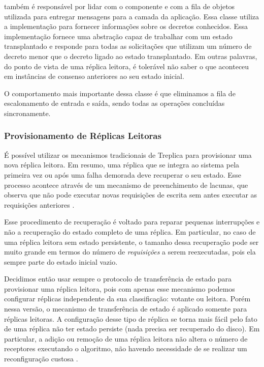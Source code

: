  também é responsável por lidar com o componente
 e com a fila de objetos utilizada para entregar mensagens para a camada
da aplicação. Essa classe utiliza a implementação  para
fornecer informações sobre os decretos conhecidos. Essa implementação fornece uma
abstração capaz de trabalhar com um estado transplantado e responde  para
todas as solicitações que utilizam um número de decreto menor que o decreto ligado ao
estado transplantado. Em outras palavras, do ponto de vista de uma réplica leitora, é
tolerável não saber o que aconteceu em instâncias de consenso anteriores ao seu estado
inicial.

O comportamento mais importante dessa classe é que eliminamos a fila de escalonamento de
entrada e saída, sendo todas as operações concluídas sincronamente.

\subsubsection{Provisionamento de Réplicas Leitoras}

É possível utilizar os mecanismos tradicionais de Treplica para provisionar uma nova
réplica leitora. Em resumo, uma réplica que se integra ao sistema pela primeira vez ou
após uma falha demorada deve recuperar o seu estado. Esse processo acontece através de um
mecanismo de preenchimento de lacunas, que observa que não pode executar novas requisições
de escrita sem antes executar as requisições anteriores \cite{vieira-tr10b}.

Esse procedimento de recuperação é voltado para reparar pequenas interrupções e não a
recuperação do estado completo de uma réplica. Em particular, no caso de uma réplica
leitora sem estado persistente, o tamanho dessa recuperação pode ser muito grande em
termos do número de \emph{requisições} a serem reexecutadas, pois ela sempre parte do
estado inicial vazio.

Decidimos então usar sempre o protocolo de transferência de estado para provisionar uma
réplica leitora, pois com apenas esse mecanismo podemos configurar réplicas independente
da sua classificação: votante ou leitora. Porém nessa versão, o mecanismo de transferência
de estado é aplicado somente para réplicas leitoras. A configuração desse tipo de réplica
se torna mais fácil pelo fato de uma réplica não ter estado persiste (nada precisa ser
recuperado do disco). Em particular, a adição ou remoção de uma réplica leitora não altera
o número de receptores executando o algoritmo, não havendo necessidade de se realizar um
reconfiguração custosa \cite{lamport10}.

